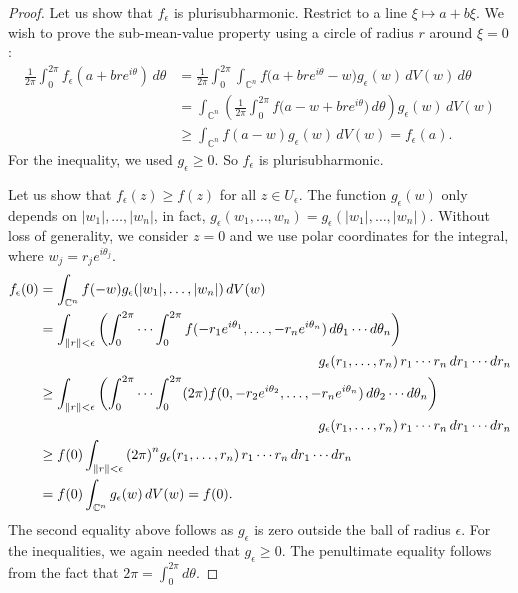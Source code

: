 \documentclass[12pt,openany]{book}
\newcommand{\sabs}[1]{\lvert {#1} \rvert}
\newcommand{\snorm}[1]{\lVert {#1} \rVert}
\newcommand{\C}{{\mathbb{C}}}
\theoremstyle{plain}
\theoremstyle{remark}
\theoremstyle{definition}
\theoremstyle{exercise}
\theoremstyle{example}
\begin{document}
\begin{proof}
\pagebreak[1]
Let us show that $f_\epsilon$ is plurisubharmonic.
Restrict to a line $\xi \mapsto a+b\xi$.
We wish to prove the sub-mean-value property using a circle
of radius $r$ around $\xi = 0$:
\begin{equation*}
\begin{split}
\frac{1}{2\pi} \int_0^{2\pi} f_\epsilon(a+bre^{i\theta})\, d\theta & =
\frac{1}{2\pi} \int_0^{2\pi}
\int_{\C^n}
f\bigl(a+bre^{i\theta}-w\bigr) g_\epsilon (w) \, dV(w)
\,d\theta
\\
& =
\int_{\C^n}
\left(
\frac{1}{2\pi} \int_0^{2\pi}
f\bigl(a-w+bre^{i\theta}\bigr) \, d\theta \right) g_\epsilon (w) \, dV(w)
\\
& \geq
\int_{\C^n}
f(a-w) g_\epsilon (w) \, dV(w)  = f_\epsilon(a).
\end{split}
\end{equation*}
For the inequality, we used $g_\epsilon \geq 0$.
So $f_\epsilon$ is plurisubharmonic.

Let us show that $f_\epsilon(z) \geq f(z)$ for all $z \in U_\epsilon$.
The function $g_\epsilon(w)$ only depends on $\sabs{w_1},\ldots,\sabs{w_n}$,
in fact,
$g_\epsilon(w_1,\ldots,w_n) =
g_\epsilon(\sabs{w_1},\ldots,\sabs{w_n})$.
Without loss of generality, we consider $z=0$ and we use polar coordinates
for the integral, where $w_j = r_je^{i\theta_j}$.
\pagebreak[1]
\begin{equation*}
\begin{split}
f_\epsilon(0)
& =
\int_{\C^n} f(-w) g_\epsilon (\sabs{w_1},\ldots,\sabs{w_n})
\, dV(w)
\\
& =
\int_{\snorm{r} < \epsilon}
\left(
\int_0^{2\pi}
\cdots
\int_0^{2\pi}
 f(-r_1e^{i\theta_1},\ldots,
-r_ne^{i\theta_n}) \,
d\theta_1 \cdots d\theta_n \right)
\\
& \hspace{2.8in}
g_\epsilon (r_1,\ldots,r_n) \,
 r_1 \cdots r_n \,d r_1 \cdots d r_n
\\
& \geq
\int_{\snorm{r} < \epsilon}
\left(
\int_0^{2\pi}
\cdots
\int_0^{2\pi}
(2\pi)
 f(0,-r_2e^{i\theta_2},\ldots,
-r_ne^{i\theta_n}) \,
d\theta_2 \cdots d\theta_n \right)
\\
& \hspace{2.8in}
g_\epsilon (r_1,\ldots,r_n) \,
 r_1 \cdots r_n \,d r_1 \cdots d r_n
\\
& \geq
f(0)
\int_{\snorm{r} < \epsilon}
{(2\pi)}^n
g_\epsilon (r_1,\ldots,r_n) \,
 r_1 \cdots r_n \,d r_1 \cdots d r_n
\\
& = f(0) \int_{\C^n} g_\epsilon (w) \, dV(w)
= f(0) .
\end{split}
\end{equation*}
The second equality above
follows as $g_\epsilon$ is zero
outside the ball of radius $\epsilon$.
For the inequalities, we again needed that $g_\epsilon \geq 0$.
The penultimate equality follows from the fact that
$2\pi = \int_0^{2\pi}d \theta$.


\end{proof}
\end{document}
